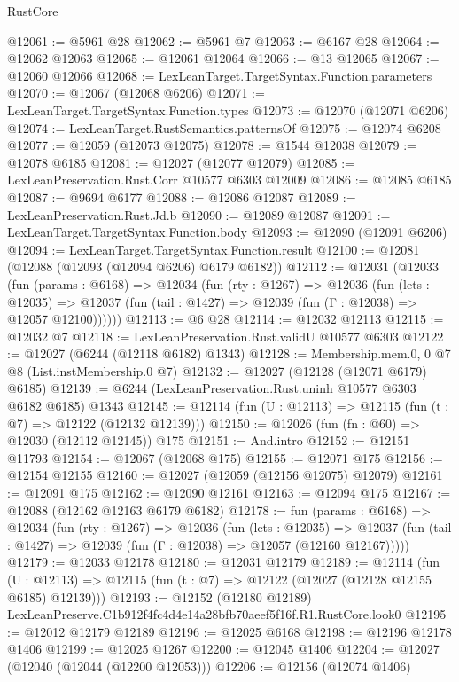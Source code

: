 \begin{lexlean}{RustCore}
\begin{coremodule}
@12061 := @5961 @28
@12062 := @5961 @7
@12063 := @6167 @28
@12064 := @12062 @12063
@12065 := @12061 @12064
@12066 := @13 @12065
@12067 := @12060 @12066
@12068 := LexLeanTarget.TargetSyntax.Function.parameters
@12070 := @12067 (@12068 @6206)
@12071 := LexLeanTarget.TargetSyntax.Function.types
@12073 := @12070 (@12071 @6206)
@12074 := LexLeanTarget.RustSemantics.patternsOf
@12075 := @12074 @6208
@12077 := @12059 (@12073 @12075)
@12078 := @1544 @12038
@12079 := @12078 @6185
@12081 := @12027 (@12077 @12079)
@12085 := LexLeanPreservation.Rust.Corr @10577 @6303 @12009
@12086 := @12085 @6185
@12087 := @9694 @6177
@12088 := @12086 @12087
@12089 := LexLeanPreservation.Rust.Jd.b
@12090 := @12089 @12087
@12091 := LexLeanTarget.TargetSyntax.Function.body
@12093 := @12090 (@12091 @6206)
@12094 := LexLeanTarget.TargetSyntax.Function.result
@12100 := @12081 (@12088 (@12093 (@12094 @6206) @6179 @6182))
@12112 := @12031
    (@12033
      (fun (params : @6168) =>
      @12034
        (fun (rty : @1267) =>
        @12036
          (fun (lets : @12035) =>
          @12037 (fun (tail : @1427) => @12039 (fun (Γ : @12038) => @12057 @12100))))))
@12113 := @6 @28
@12114 := @12032 @12113
@12115 := @12032 @7
@12118 := LexLeanPreservation.Rust.validU @10577 @6303
@12122 := @12027 (@6244 (@12118 @6182) @1343)
@12128 := Membership.mem.{0, 0} @7 @8 (List.instMembership.{0} @7)
@12132 := @12027 (@12128 (@12071 @6179) @6185)
@12139 := @6244 (LexLeanPreservation.Rust.uninh @10577 @6303 @6182 @6185) @1343
@12145 := @12114 (fun (U : @12113) => @12115 (fun (t : @7) => @12122 (@12132 @12139)))
@12150 := @12026 (fun (fn : @60) => @12030 (@12112 @12145)) @175
@12151 := And.intro
@12152 := @12151 @11793
@12154 := @12067 (@12068 @175)
@12155 := @12071 @175
@12156 := @12154 @12155
@12160 := @12027 (@12059 (@12156 @12075) @12079)
@12161 := @12091 @175
@12162 := @12090 @12161
@12163 := @12094 @175
@12167 := @12088 (@12162 @12163 @6179 @6182)
@12178 := fun (params : @6168) =>
  @12034
    (fun (rty : @1267) =>
    @12036
      (fun (lets : @12035) =>
      @12037 (fun (tail : @1427) => @12039 (fun (Γ : @12038) => @12057 (@12160 @12167)))))
@12179 := @12033 @12178
@12180 := @12031 @12179
@12189 := @12114
    (fun (U : @12113) => @12115 (fun (t : @7) => @12122 (@12027 (@12128 @12155 @6185) @12139)))
@12193 := @12152 (@12180 @12189) LexLeanPreserve.C1b912f4fc4d4e14a28bfb70aeef5f16f.R1.RustCore.look0
@12195 := @12012 @12179 @12189
@12196 := @12025 @6168
@12198 := @12196 @12178 @1406
@12199 := @12025 @1267
@12200 := @12045 @1406
@12204 := @12027 (@12040 (@12044 (@12200 @12053)))
@12206 := @12156 (@12074 @1406)

\end{coremodule}
\end{lexlean}
